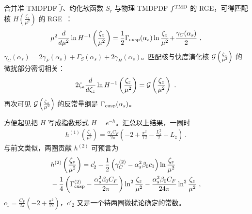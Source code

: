 合并准 TMDPDF $\tilde f$、约化软函数 $S_r$ 与物理 TMDPDF $f^{\rm TMD}$ 的 RGE，可得匹配核 $H\left(\frac{\zeta_z}{\mu^2}\right)$ 的 RGE~\cite{Ji:2019ewn}：
\begin{align}
	\mu^2 \frac{d}{d\mu^2} \ln H^{-1}\left(\frac{\zeta_z}{\mu^2}\right)=\frac{1}{2}\Gamma_{\rm cusp}(\alpha_s)  \ln\frac{\zeta_z}{\mu^2}\!+\!\frac{\gamma_C(\alpha_s)}{2}  \ ,
\end{align}
$\gamma_C(\alpha_s)=2\gamma_F(\alpha_s)+\Gamma_S(\alpha_s)+2\gamma_H(\alpha_s)$。匹配核与快度演化核 ${\cal G}\left(\frac{\zeta_z}{\mu^2}\right)$ 的微扰部分密切相关：
\begin{align}
	2\zeta_z\frac{d}{d\zeta_z}\ln H^{-1}\left(\frac{\zeta_z}{\mu^2}\right)={\cal G}\left(\frac{\zeta_z}{\mu^2}\right) \ .
\end{align}
再次可见 ${\cal G}\left(\frac{\zeta_z}{\mu^2}\right)$ 的反常量纲是 $\Gamma_{\rm cusp}(\alpha_s)$。

方便起见把 $H$ 写成指数形式 $H=e^{-h}$。汇总以上结果，一圈时~\cite{Ji:2018hvs,Ebert:2019okf}
\begin{align}
	h^{(1)}\left(\frac{\zeta_z}{\mu^2}
	\right)=\frac{\alpha_sC_F}{2\pi}\left(-2+\frac{\pi^2}{12}-\frac{L_z^2}{2}+L_z\right) \ .
\end{align}
与前文类似，两圈贡献 $h^{(2)}$ 可预言为
\begin{align}
	&h^{(2)}\left(\frac{\zeta_z}{\mu^2}\right)=c'_2-\frac{1}{2}\left(\gamma^{(2)}_C-\alpha_s^2\beta_0 c_1\right)\ln\frac{\zeta_z}{\mu^2}\\
	&-\frac{1}{4}\left(\Gamma^{(2)}_{\rm cusp}-\frac{\alpha_s^2\beta_0 C_F}{2\pi}\right)\ln^2\frac{\zeta_z}{\mu^2}-\frac{\alpha_s^2\beta_0C_F}{24\pi}\ln^3\frac{\zeta_z}{\mu^2} \ ,\nonumber
\end{align}
$c_1=\frac{C_F}{2\pi}\left(-2+\frac{\pi^2}{12}\right)$，$c'_2$ 又是一个待两圈微扰论确定的常数。


